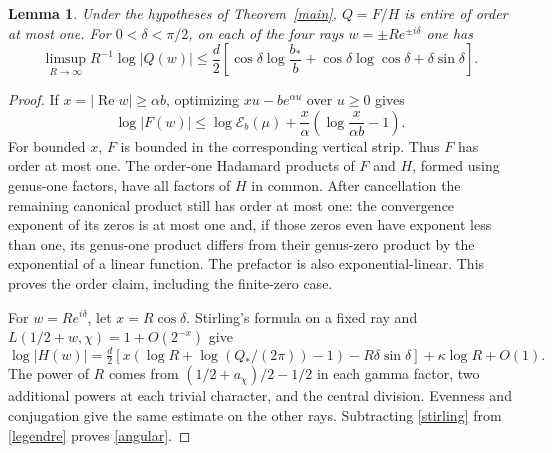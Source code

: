 \documentclass[11pt]{article}
\newtheorem{lemma}[theorem]{Lemma}
\newcommand{\E}{\mathcal E}\newcommand{\F}{\mathcal F}
\newcommand{\Rea}{\operatorname{Re}}\newcommand{\ord}{\operatorname{ord}}
\begin{document}
\begin{lemma}\label{rays}
Under the hypotheses of Theorem~\ref{main}, $Q=F/H$ is entire of order at most one. For $0<\delta<\pi/2$, on each of the four rays $w=\pm R e^{\pm i\delta}$ one has
\begin{equation}\label{angular}
 \limsup_{R\to\infty}R^{-1}\log|Q(w)|\le \frac d2\left[\cos\delta\log\frac{b_*}b+\cos\delta\log\cos\delta+\delta\sin\delta\right].
\end{equation}
\end{lemma}
\begin{proof}
If $x=|\Rea w|\ge\alpha b$, optimizing $xu-be^{\alpha u}$ over $u\ge0$ gives
\begin{equation}\label{legendre}
 \log |F(w)|\le \log\E_b(\mu)+\frac{x}{\alpha}\left(\log\frac{x}{\alpha b}-1\right).
\end{equation}
For bounded $x$, $F$ is bounded in the corresponding vertical strip. Thus $F$ has order at most one. The order-one Hadamard products of $F$ and $H$, formed using genus-one factors, have all factors of $H$ in common. After cancellation the remaining canonical product still has order at most one: the convergence exponent of its zeros is at most one and, if those zeros even have exponent less than one, its genus-one product differs from their genus-zero product by the exponential of a linear function. The prefactor is also exponential-linear. This proves the order claim, including the finite-zero case.

For $w=Re^{i\delta}$, let $x=R\cos\delta$. Stirling's formula on a fixed ray and $L(1/2+w,\chi)=1+O(2^{-x})$ give
\begin{equation}\label{stirling}
 \log|H(w)|=\tfrac d2\left[x\left(\log R+\log(Q_*/(2\pi))-1\right)-R\delta\sin\delta\right]+\kappa\log R+O(1).
\end{equation}
The power of $R$ comes from $(1/2+a_\chi)/2-1/2$ in each gamma factor, two additional powers at each trivial character, and the central division. Evenness and conjugation give the same estimate on the other rays. Subtracting \eqref{stirling} from \eqref{legendre} proves \eqref{angular}.
\end{proof}
\end{document}
